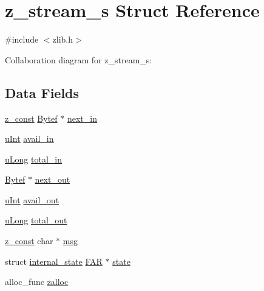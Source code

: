 \hypertarget{structz__stream__s}{}\section{z\+\_\+stream\+\_\+s Struct Reference}
\label{structz__stream__s}


{\ttfamily \#include $<$zlib.\+h$>$}



Collaboration diagram for z\+\_\+stream\+\_\+s\+:
\subsection*{Data Fields}
\begin{DoxyCompactItemize}
\item 
\hyperlink{zconf_8h_a8dc97a57ad456f3016c710ee6507dbee}{z\+\_\+const} \hyperlink{zconf_8h_aeb722a888064be47e12d05f692e0f407}{Bytef} $\ast$ \hyperlink{structz__stream__s_a71613678076af3a9a4bb28d51a146150}{next\+\_\+in}
\item 
\hyperlink{zconf_8h_a87d141052bcd5ec8a80812a565c70369}{u\+Int} \hyperlink{structz__stream__s_a0cf177f50dbb49692f27480cbcfde794}{avail\+\_\+in}
\item 
\hyperlink{zconf_8h_acd2a5701a3aecf6700d2c66c606ecb40}{u\+Long} \hyperlink{structz__stream__s_aa8f408b9632737dc21519fa1ed34b08d}{total\+\_\+in}
\item 
\hyperlink{zconf_8h_aeb722a888064be47e12d05f692e0f407}{Bytef} $\ast$ \hyperlink{structz__stream__s_aed4a02cfe93e975314fed50b04427bf3}{next\+\_\+out}
\item 
\hyperlink{zconf_8h_a87d141052bcd5ec8a80812a565c70369}{u\+Int} \hyperlink{structz__stream__s_a45ad2364307af9d944fd39d4eca3ca3c}{avail\+\_\+out}
\item 
\hyperlink{zconf_8h_acd2a5701a3aecf6700d2c66c606ecb40}{u\+Long} \hyperlink{structz__stream__s_abae26f1f236cf920250b9d37fdf009c1}{total\+\_\+out}
\item 
\hyperlink{zconf_8h_a8dc97a57ad456f3016c710ee6507dbee}{z\+\_\+const} char $\ast$ \hyperlink{structz__stream__s_af116e1f45cb4399c0568b23b3e8b8c16}{msg}
\item 
struct \hyperlink{structinternal__state}{internal\+\_\+state} \hyperlink{zconf_8h_aef060b3456fdcc093a7210a762d5f2ed}{F\+AR} $\ast$ \hyperlink{structz__stream__s_ac4a114217a1868dc6fbe7d1f5bda126b}{state}
\item 
alloc\+\_\+func \hyperlink{structz__stream__s_a23a2299c384f808e76e9908f21216b0f}{zalloc}

\end{DoxyCompactItemize}

